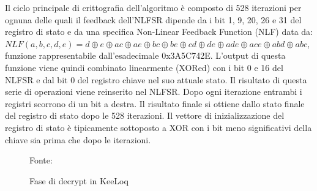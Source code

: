 Il ciclo principale di crittografia dell’algoritmo è composto di 528 iterazioni per ognuna delle quali il feedback dell’NLFSR dipende da i bit 1, 9, 20, 26 e 31 del registro di stato e da una specifica Non-Linear Feedback Function (NLF) data da: \(NLF(a, b, c, d, e) = d \oplus e \oplus ac \oplus ae \oplus bc \oplus be \oplus cd \oplus de \oplus ade \oplus ace \oplus abd \oplus abc\), funzione rappresentabile dall’esadecimale 0x3A5C742E. L’output di questa funzione viene quindi combinato linearmente (XORed) con i bit 0 e 16 del NLFSR e dal bit 0 del registro chiave nel suo attuale stato. Il risultato di questa serie di operazioni viene reinserito nel NLFSR. Dopo ogni iterazione entrambi i registri scorrono di un bit a destra. Il risultato finale si ottiene dallo stato finale del registro di stato dopo le 528 iterazioni. Il vettore di inizializzazione del registro di stato è tipicamente sottoposto a XOR con i bit meno significativi della chiave sia prima che dopo le iterazioni.\\

\begin{figure} %
  \centering
  \def\stackalignment{r} %
  {\scriptsize \parbox[t]{\linewidth}{ Fonte: \cite{keeloqwiki}} }
  \caption{Fase di decrypt in KeeLoq}
  \label{fig:keeloq_decrypt}
\end{figure}

